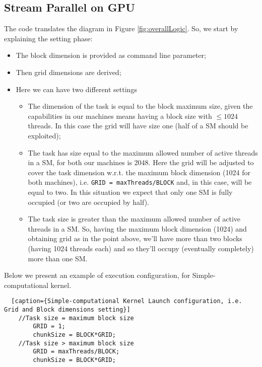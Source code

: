 \subsection{Stream Parallel on GPU}
	The code translates the diagram in Figure \ref{fig:overallLogic}.
	So, we start by explaining the setting phase:
	\begin{itemize}
		\item The block dimension is provided as command line parameter;
		\item Then grid dimensions are derived;
		\item Here we can have two different settings
		\begin{itemize}
			\item The dimension of the task is equal to the block maximum size, given the capabilities in our machines means having a block size with \(\leq 1024\) threads. In this case the grid will have size one (half of a SM should be exploited);
			\item The task has size equal to the maximum allowed number of active threads in a SM, for both our machines is 2048. Here the grid will be adjusted to cover the task dimension w.r.t. the maximum block dimension (1024 for both machines), i.e. \texttt{GRID = maxThreads/BLOCK} and, in this case, will be equal to two. In this situation we expect that only one SM is fully occupied (or two are occupied by half).
			\item The task size is greater than the maximum allowed number of active threads in a SM. So, having the maximum block dimension (1024) and obtaining grid as in the point above, we'll have more than two blocks (having 1024 threads each) and so they'll occupy (eventually completely) more than one SM.
		\end{itemize}
	
	\end{itemize}
	Below we present an example of execution configuration, for Simple-computational kernel. 
	\begin{lstlisting}	[caption={Simple-computational Kernel Launch configuration, i.e. Grid and Block dimensions setting}]	
	//Task size = maximum block size
		GRID = 1;
		chunkSize = BLOCK*GRID;		
	//Task size > maximum block size
		GRID = maxThreads/BLOCK;  
		chunkSize = BLOCK*GRID;		
	\end{lstlisting}
	
